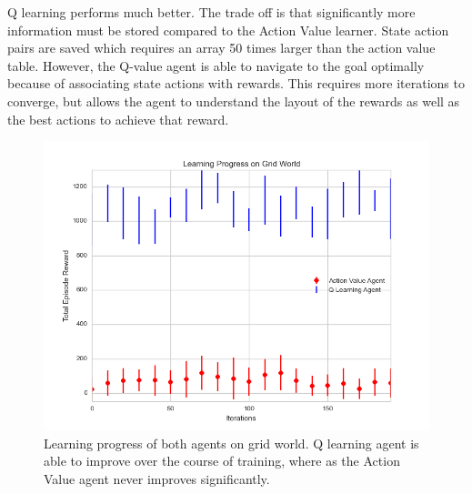 Q learning performs much better.  The trade off is that significantly more information must be stored compared to the Action Value learner.  State action pairs are saved which requires an array 50 times larger than the action value table.  However, the Q-value agent is able to navigate to the goal optimally because of associating state actions with rewards.  This requires more iterations to converge, but allows the agent to understand the layout of the rewards as well as the best actions to achieve that reward.


\begin{figure}[h]
\includegraphics[width=1.0\linewidth]{GridWorldLearning.png}
\caption{Learning progress of both agents on grid world.  Q learning agent is able to improve over the course of training, where as the Action Value agent never improves significantly.}
\label{fig:GridLearn}
\end{figure}

